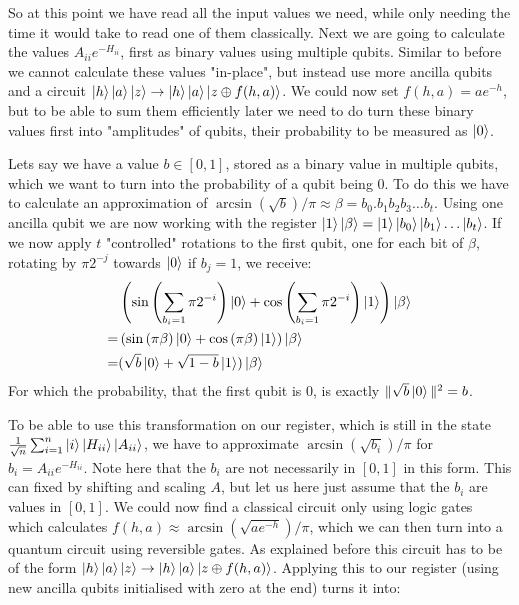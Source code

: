\documentclass[11pt,a4paper]{scrartcl}
\begin{document}
So at this point we have read all the input values we need, while only needing the time it would take to read one of them classically. Next we are going to calculate the values $A_{ii}e^{-H_{ii}}$, first as binary values using multiple qubits. Similar to before we cannot calculate these values "in-place", but instead use more ancilla qubits and a circuit $\ket{h}\ket{a}\ket{z}\to\ket{h}\ket{a}\ket{z\oplus f(h,a)}$. We could now set $f(h,a)=ae^{-h}$, but to be able to sum them efficiently later we need to do turn these binary values first into "amplitudes" of qubits, their probability to be measured as $\ket{0}$.

Lets say we have a value $b\in [0,1]$, stored as a binary value in multiple qubits, which we want to turn into the probability of a qubit being 0. To do this we have to calculate an approximation of $\arcsin(\sqrt{b})/\pi\approx \beta=b_0.b_1b_2b_3\ldots b_t$. Using one ancilla qubit we are now working with the register $\ket{1}\ket{\beta}=\ket{1}\ket{b_0}\ket{b_1}\ldots\ket{b_t}$. If we now apply $t$ "controlled" rotations to the first qubit, one for each bit of $\beta$, rotating by $\pi 2^{-j}$ towards $\ket{0}$ if $b_j=1$, we receive:
\begin{align*}
&\left(\sin\left(\sum_{b_i=1} \pi 2^{-i}\right)\ket{0}
+\cos\left(\sum_{b_i=1} \pi 2^{-i}\right)\ket{1}\right)
 \ket{\beta}\\
=&\left(\sin\left(\pi\beta\right)\ket{0}
+\cos\left(\pi\beta\right)\ket{1}\right)
 \ket{\beta}\\
=&(\sqrt{b}\ket{0}+\sqrt{1-b}\ket{1})\ket{\beta}
\end{align*}
For which the probability, that the first qubit is 0, is exactly $\|\sqrt{b}\ket{0}\|^2=b$.

To be able to use this transformation on our register, which is still in the state $\frac{1}{\sqrt{n}}\sum_{i=1}^n\ket{i}\ket{H_{ii}}\ket{A_{ii}}$, we have to approximate $\arcsin(\sqrt{b_i})/\pi$ for $b_i=A_{ii}e^{-H_{ii}}$. Note here that the $b_i$ are not necessarily in $[0,1]$ in this form. This can fixed by shifting and scaling $A$, but let us here just assume that the $b_i$ are values in $[0,1]$. We could now find a classical circuit only using logic gates which calculates $f(h,a)\approx \arcsin(\sqrt{ae^{-h}})/\pi$, which we can then turn into a quantum circuit using reversible gates. As explained before this circuit has to be of the form $\ket{h}\ket{a}\ket{z}\to\ket{h}\ket{a}\ket{z\oplus f(h,a)}$. Applying this to our register (using new ancilla qubits initialised with zero at the end) turns it into:
\end{document}
